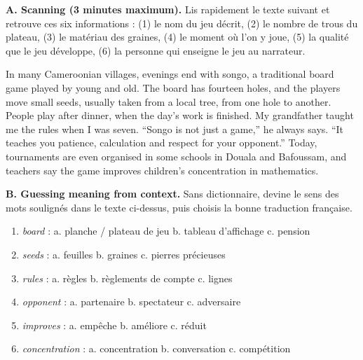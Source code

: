 \documentclass[11pt]{article}
\begin{document}
\begin{exercice}
\textbf{A. Scanning (3 minutes maximum).} Lis rapidement le texte suivant et retrouve ces six informations : (1) le nom du jeu décrit, (2) le nombre de trous du plateau, (3) le matériau des graines, (4) le moment où l'on y joue, (5) la qualité que le jeu développe, (6) la personne qui enseigne le jeu au narrateur.
\begin{textebox}
In many Cameroonian villages, evenings end with songo, a traditional board game played by young and old. The board has fourteen holes, and the players move small seeds, usually taken from a local tree, from one hole to another. People play after dinner, when the day's work is finished. My grandfather taught me the rules when I was seven. “Songo is not just a game,” he always says. “It teaches you patience, calculation and respect for your opponent.” Today, tournaments are even organised in some schools in Douala and Bafoussam, and teachers say the game improves children's concentration in mathematics.
\end{textebox}
\textbf{B. Guessing meaning from context.} Sans dictionnaire, devine le sens des mots soulignés dans le texte ci-dessus, puis choisis la bonne traduction française.
\begin{enumerate}
\item \emph{board} : a. planche / plateau de jeu \quad b. tableau d'affichage \quad c. pension
\item \emph{seeds} : a. feuilles \quad b. graines \quad c. pierres précieuses
\item \emph{rules} : a. règles \quad b. règlements de compte \quad c. lignes
\item \emph{opponent} : a. partenaire \quad b. spectateur \quad c. adversaire
\item \emph{improves} : a. empêche \quad b. améliore \quad c. réduit
\item \emph{concentration} : a. concentration \quad b. conversation \quad c. compétition
\end{enumerate}
\end{exercice}
\end{document}
